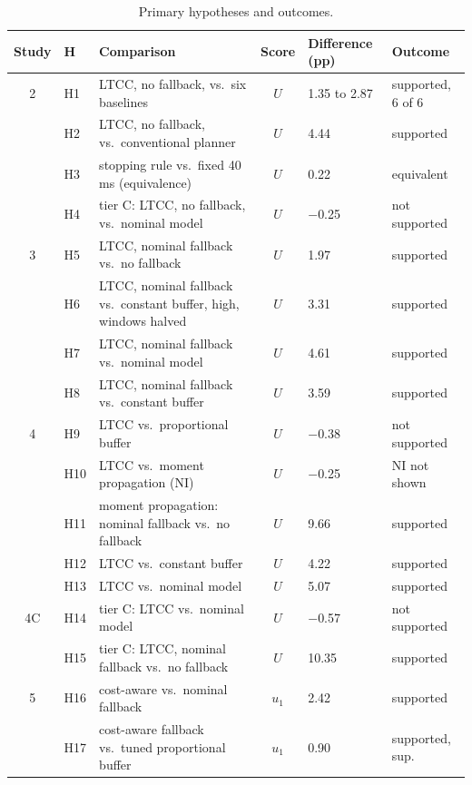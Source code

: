 \documentclass[a4paper,fleqn]{cas-dc}
\newcommand{\mname}{LTCC}  %
\newcommand{\uprighttext}{\def\textbf##1{##1}\def\textit##1{##1}}
\newcounter{prop}
\begin{document}
\begingroup\uprighttext
\begin{table}[t]
\caption{Primary hypotheses and outcomes.}\label{tab:hyp}
\centering\footnotesize
\setlength{\tabcolsep}{3pt}
\begin{threeparttable}
\begin{tabular}{@{}cllcll@{}}
\toprule
Study & H & Comparison & Score & Difference (pp) & Outcome \\
\midrule
2 & H1 & \mname{}, no fallback, vs.\ six baselines & $U$ & 1.35 to 2.87 & supported, 6 of 6 \\
  & H2 & \mname{}, no fallback, vs.\ conventional planner & $U$ & 4.44 & supported \\
  & H3 & stopping rule vs.\ fixed 40\,ms (equivalence) & $U$ & 0.22 & equivalent \\
  & H4 & tier C: \mname{}, no fallback, vs.\ nominal model & $U$ & $-$0.25 & not supported \\
\midrule
3 & H5 & \mname{}, nominal fallback vs.\ no fallback & $U$ & 1.97 & supported \\
  & H6 & \mname{}, nominal fallback vs.\ constant buffer, high, windows halved & $U$ & 3.31 & supported \\
  & H7 & \mname{}, nominal fallback vs.\ nominal model & $U$ & 4.61 & supported \\
  & H8 & \mname{}, nominal fallback vs.\ constant buffer & $U$ & 3.59 & supported \\
\midrule
4 & H9 & \mname{} vs.\ proportional buffer & $U$ & $-$0.38 & not supported \\
  & H10 & \mname{} vs.\ moment propagation (NI) & $U$ & $-$0.25 & NI not shown \\
  & H11 & moment propagation: nominal fallback vs.\ no fallback & $U$ & 9.66 & supported \\
  & H12 & \mname{} vs.\ constant buffer & $U$ & 4.22 & supported \\
  & H13 & \mname{} vs.\ nominal model & $U$ & 5.07 & supported \\
\midrule
4C & H14 & tier C: \mname{} vs.\ nominal model & $U$ & $-$0.57 & not supported \\
   & H15 & tier C: \mname{}, nominal fallback vs.\ no fallback & $U$ & 10.35 & supported \\
\midrule
5 & H16 & cost-aware vs.\ nominal fallback & $u_1$ & 2.42 & supported \\
  & H17 & cost-aware fallback vs.\ tuned proportional buffer & $u_1$ & 0.90 & supported, sup. \\

\end{tabular}
\end{threeparttable}
\end{table}
\end{document}
